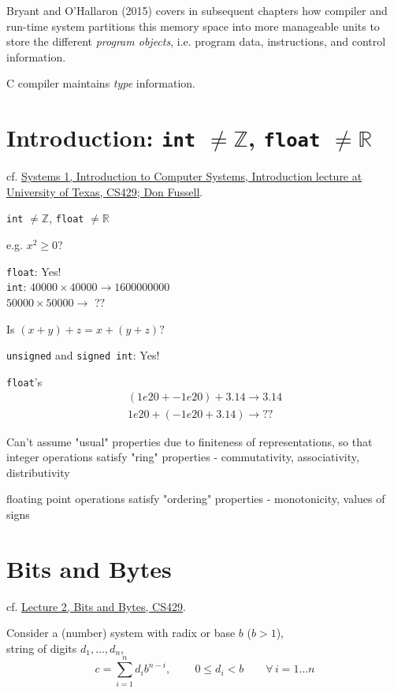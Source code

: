 \documentclass[10pt]{amsart}
\begin{document}
\begin{multicols*}{2}
Bryant and O'Hallaron (2015) \cite{BrOH2016} covers in subsequent chapters how compiler and run-time system partitions this memory space into more manageable units to store the different \emph{program objects}, i.e. program data, instructions, and control information.

C compiler maintains \emph{type} information.




\section{Introduction: \texttt{int} $\neq \mathbb{Z}$, \texttt{float} $\neq \mathbb{R}$}

cf. \href{https://www.cs.utexas.edu/users/fussell/courses/cs429h/lectures/Lecture_1-429h.pdf}{Systems 1, Introduction to Computer Systems, Introduction lecture at University of Texas, CS429; Don Fussell}.

\texttt{int} $\neq \mathbb{Z}$, \texttt{float} $\neq \mathbb{R}$

e.g. $x^2 \geq 0$? 

\texttt{float}: Yes!  \\
\texttt{int}: $40000 \times 40000 \to 1600000000$ \\
\phantom{int} $50000 \times 50000 \to $ ??

Is $(x+y) + z = x + (y +z)?$

\texttt{unsigned} and \texttt{signed int}: Yes!

\texttt{float}'s 
\[
\begin{gathered}
(1e20 + -1e20) + 3.14 \to 3.14 \\
1e20 + (-1e20 + 3.14) \to ??
\end{gathered}
\]

Can't assume "usual" properties due to finiteness of representations, so that integer operations satisfy "ring" properties
- commutativity, associativity, distributivity

floating point operations satisfy "ordering" properties
- monotonicity, values of signs


\section{Bits and Bytes}

cf. \href{https://www.cs.utexas.edu/users/fussell/courses/cs429h/lectures/Lecture_2-429h.pdf}{Lecture 2, Bits and Bytes, CS429}.

Consider a (number) system with radix or base $b$ ($b>1$), \\
string of digits $d_1, \dots , d_n$, \\
\begin{equation}
c = \sum_{i=1}^n d_i b^{n-i}, \qquad \, 0 \leq d_i < b \qquad \forall \, i = 1 \dots n 
\end{equation}


\end{multicols*}
\end{document}
